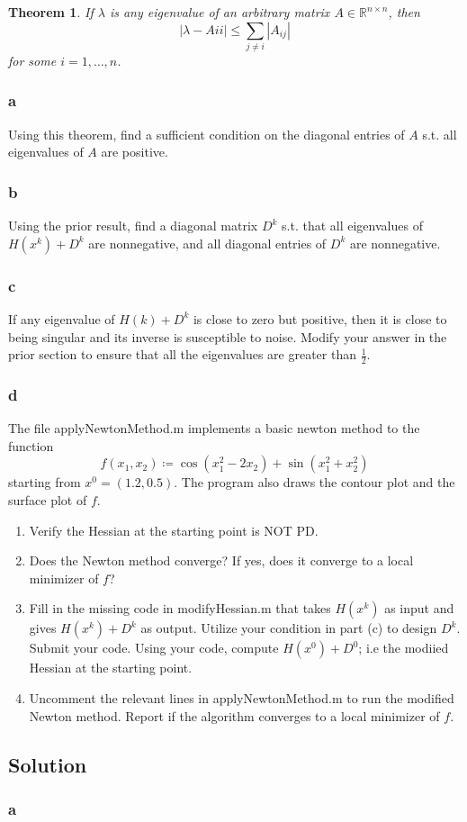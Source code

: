 \documentclass[11pt]{report}
\newtheorem{theorem}{Theorem}[chapter]
\theoremstyle{definition}
\begin{document}
\begin{theorem}
	If $\lambda$ is any eigenvalue of an arbitrary matrix $A\in\mathbb{R}^{n\times n}$, then
	\[|\lambda-A{ii}|\leq\sum_{j\neq i}|A_{ij}|\]
	for some $i=1,\ldots,n$.
\end{theorem}
\subsubsection*{a}
Using this theorem, find a sufficient condition on the diagonal entries of $A$
s.t. all eigenvalues of $A$ are positive.
\subsubsection*{b}
Using the prior result, find a diagonal matrix $D^k$ s.t. that all eigenvalues of $H(x^k)+D^k$
are nonnegative, and all diagonal entries of $D^k$ are nonnegative.
\subsubsection*{c}
If any eigenvalue of $H(k)+D^k$ is close to zero but positive, then it is close
to being singular and its inverse is susceptible to noise. Modify your answer in the prior section to
ensure that all the eigenvalues are greater than $\frac{1}{2}$.
\subsubsection*{d}
The file applyNewtonMethod.m implements a basic newton method to the function
\[f(x_1, x_2)\coloneqq \cos(x_1^2-2x_2)+\sin(x_1^2+x_2^2)\]
starting from $x^0=(1.2,0.5)$. The program also draws the contour plot and the surface plot of $f$.
\begin{enumerate}
	\item Verify the Hessian at the starting point is NOT PD.
	\item Does the Newton method converge? If yes, does it converge to a local
	      minimizer of $f$?
	\item Fill in the missing code in modifyHessian.m that takes $H(x^k)$ as
	      input and gives $H(x^k)+D^k$ as output. Utilize your condition in part
	      (c) to design $D^k$. Submit your code. Using your code, compute
	      $H(x^0)+D^0$; i.e the modiied Hessian at the starting point.
	\item Uncomment the relevant lines in applyNewtonMethod.m to run the
	      modified Newton method. Report if the algorithm converges to a local
	      minimizer of $f$.
\end{enumerate}

\subsection*{Solution}
\subsubsection*{a}


\end{document}
